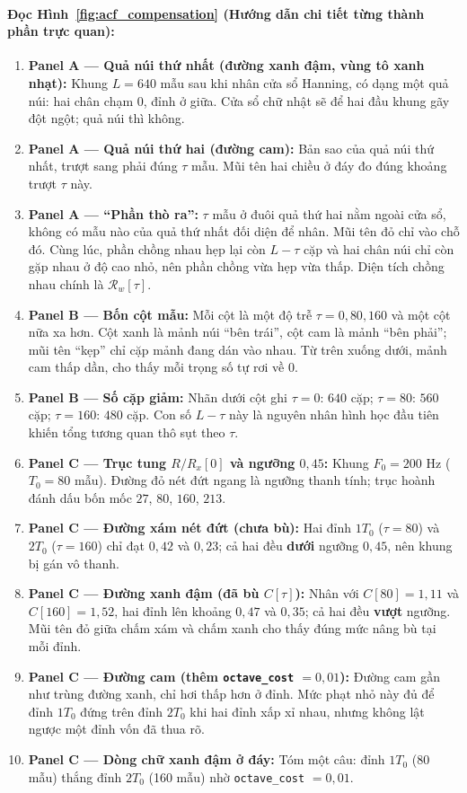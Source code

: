\documentclass[11pt,a4paper]{article}
\begin{document}
\paragraph{Đọc Hình~\ref{fig:acf_compensation} (Hướng dẫn chi tiết từng thành phần trực quan):}
\begin{enumerate}
    \setlength{\itemsep}{1.5pt}
    \item \textbf{Panel A --- Quả núi thứ nhất (đường xanh đậm, vùng tô xanh nhạt):} Khung $L = 640$ mẫu sau khi nhân cửa sổ Hanning, có dạng một quả núi: hai chân chạm $0$, đỉnh ở giữa. Cửa sổ chữ nhật sẽ để hai đầu khung gãy đột ngột; quả núi thì không.
    \item \textbf{Panel A --- Quả núi thứ hai (đường cam):} Bản sao của quả núi thứ nhất, trượt sang phải đúng $\tau$ mẫu. Mũi tên hai chiều ở đáy đo đúng khoảng trượt $\tau$ này.
    \item \textbf{Panel A --- ``Phần thò ra'':} $\tau$ mẫu ở đuôi quả thứ hai nằm ngoài cửa sổ, không có mẫu nào của quả thứ nhất đối diện để nhân. Mũi tên đỏ chỉ vào chỗ đó. Cùng lúc, phần chồng nhau hẹp lại còn $L - \tau$ cặp và hai chân núi chỉ còn gặp nhau ở độ cao nhỏ, nên phần chồng vừa hẹp vừa thấp. Diện tích chồng nhau chính là $\mathcal{R}_w[\tau]$.
    \item \textbf{Panel B --- Bốn cột mẫu:} Mỗi cột là một độ trễ $\tau = 0, 80, 160$ và một cột nữa xa hơn. Cột xanh là mảnh núi ``bên trái'', cột cam là mảnh ``bên phải''; mũi tên ``kẹp'' chỉ cặp mảnh đang dán vào nhau. Từ trên xuống dưới, mảnh cam thấp dần, cho thấy mỗi trọng số tự rơi về $0$.
    \item \textbf{Panel B --- Số cặp giảm:} Nhãn dưới cột ghi $\tau = 0$: $640$ cặp; $\tau = 80$: $560$ cặp; $\tau = 160$: $480$ cặp. Con số $L - \tau$ này là nguyên nhân hình học đầu tiên khiến tổng tương quan thô sụt theo $\tau$.
    \item \textbf{Panel C --- Trục tung $R/R_x[0]$ và ngưỡng $0{,}45$:} Khung $F_0 = 200\text{ Hz}$ ($T_0 = 80$ mẫu). Đường đỏ nét đứt ngang là ngưỡng thanh tính; trục hoành đánh dấu bốn mốc $27$, $80$, $160$, $213$.
    \item \textbf{Panel C --- Đường xám nét đứt (chưa bù):} Hai đỉnh $1T_0$ ($\tau = 80$) và $2T_0$ ($\tau = 160$) chỉ đạt $0{,}42$ và $0{,}23$; cả hai đều \textbf{dưới} ngưỡng $0{,}45$, nên khung bị gán vô thanh.
    \item \textbf{Panel C --- Đường xanh đậm (đã bù $C[\tau]$):} Nhân với $C[80] = 1{,}11$ và $C[160] = 1{,}52$, hai đỉnh lên khoảng $0{,}47$ và $0{,}35$; cả hai đều \textbf{vượt} ngưỡng. Mũi tên đỏ giữa chấm xám và chấm xanh cho thấy đúng mức nâng bù tại mỗi đỉnh.
    \item \textbf{Panel C --- Đường cam (thêm \texttt{octave\_cost} $= 0{,}01$):} Đường cam gần như trùng đường xanh, chỉ hơi thấp hơn ở đỉnh. Mức phạt nhỏ này đủ để đỉnh $1T_0$ đứng trên đỉnh $2T_0$ khi hai đỉnh xấp xỉ nhau, nhưng không lật ngược một đỉnh vốn đã thua rõ.
    \item \textbf{Panel C --- Dòng chữ xanh đậm ở đáy:} Tóm một câu: đỉnh $1T_0$ (80 mẫu) thắng đỉnh $2T_0$ (160 mẫu) nhờ \texttt{octave\_cost} $= 0{,}01$.
\end{enumerate}
\end{document}
